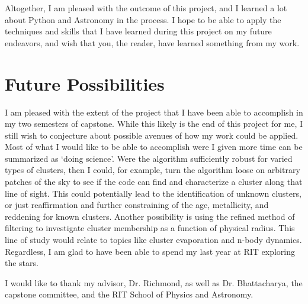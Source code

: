 \documentclass[aps,prb,twocolumn,groupedaddress,nofootinbib,floatfix]{revtex4-1}
\begin{document}
Altogether, I am pleased with the outcome of this project, and I learned a lot about Python and Astronomy in the process. I hope to be able to apply the techniques and skills that I have learned during this project on my future endeavors, and wish that you, the reader, have learned something from my work.


\section*{Future Possibilities}
I am pleased with the extent of the project that I have been able to accomplish in my two semesters of capstone. While this likely is the end of this project for me, I still wish to conjecture about possible avenues of how my work could be applied. Most of what I would like to be able to accomplish were I given more time can be summarized as `doing science'. Were the algorithm sufficiently robust for varied types of clusters, then I could, for example, turn the algorithm loose on arbitrary patches of the sky to see if the code can find and characterize a cluster along that line of sight. This could potentially lead to the identification of unknown clusters, or just reaffirmation and further constraining of the age, metallicity, and reddening for known clusters. Another possibility is using the refined method of filtering to investigate cluster membership as a function of physical radius. This line of study would relate to topics like cluster evaporation and n-body dynamics. Regardless, I am glad to have been able to spend my last year at RIT exploring the stars.

\begin{acknowledgments}
I would like to thank my advisor, Dr. Richmond, as well as Dr. Bhattacharya, the capstone committee, and the RIT School of Physics and Astronomy.
\end{acknowledgments}
%
%



\end{document}
